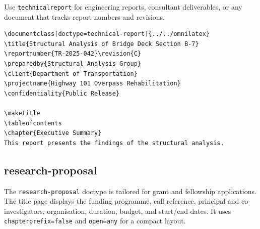 Use \texttt{technicalreport} for engineering reports, consultant
deliverables, or any document that tracks report numbers and revisions.

\begin{verbatim}
\documentclass[doctype=technical-report]{../../omnilatex}
\title{Structural Analysis of Bridge Deck Section B-7}
\reportnumber{TR-2025-042}\revision{C}
\preparedby{Structural Analysis Group}
\client{Department of Transportation}
\projectname{Highway 101 Overpass Rehabilitation}
\confidentiality{Public Release}

\maketitle
\tableofcontents
\chapter{Executive Summary}
This report presents the findings of the structural analysis.

\end{verbatim}

\subsection{research-proposal}

The \texttt{research-proposal} doctype is tailored for grant and fellowship
applications.  The title page displays the funding programme, call reference,
principal and co-investigators, organisation, duration, budget, and start/end
dates.  It uses \texttt{chapterprefix=false} and \texttt{open=any} for a
compact layout.

